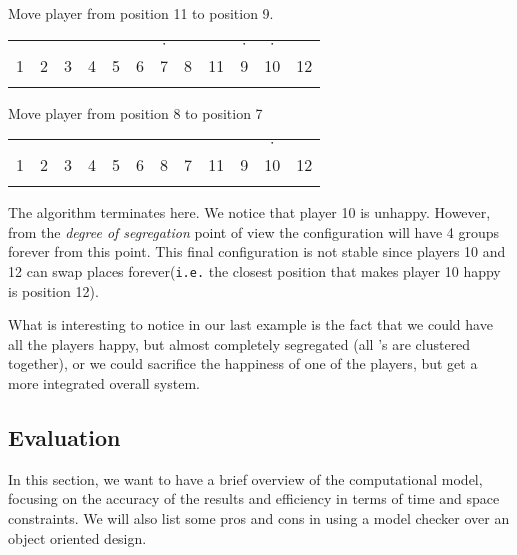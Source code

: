 \documentclass[../main.tex]{subfiles}
\begin{document}
Move player from position 11 to position 9.
 \begin{table}[H]
\begin{center}
{\begin{tabular}{| c |c| c| c| c |c| c |c|c|c|c|c| }
\hline
 &  &  & & & & $\cdot$ & &  &$\cdot$ &$\cdot$ &\\
1 & 2 &3 &4 & 5 &6  &7 &8 & 11& 9&10&12\\
\x&\x & \x &\z &\z &\z & \x &\z  &\x &\x &\z&\z \\
 \hline
\end{tabular}}
\end{center}
\end{table}

Move player from position 8 to position 7
 \begin{table}[H]
\begin{center}
{\begin{tabular}{| c |c| c| c| c |c| c |c|c|c|c|c| }
\hline
 &  &  & & & & & &  & &$\cdot$ &\\
1 & 2 &3 &4 & 5 &6  &8 &7 & 11& 9&10&12\\
\x&\x & \x &\z &\z &\z & \z &\x  &\x &\x &\z&\z \\
 \hline
\end{tabular}}
\end{center}
\end{table}

The algorithm terminates here. We notice that player 10 is unhappy. However, from the \textit{degree of segregation} point of view the configuration will have 4 groups forever from this point. This final configuration is not stable since players 10 and 12 can swap places forever(\verb|i.e.| the closest position that makes player 10 happy is position 12). 

What is interesting to notice in our last example is the fact that we could have all the players happy, but almost completely segregated (all \z 's are clustered together), or we could sacrifice the happiness of one of the players, but get a more integrated overall system.

\subsection{Evaluation}

In this section, we want to have a brief overview of the computational model, focusing on the accuracy of the results and efficiency in terms of time and space constraints. We will also list some pros and cons in using a model checker over an object oriented design. 
\end{document}
